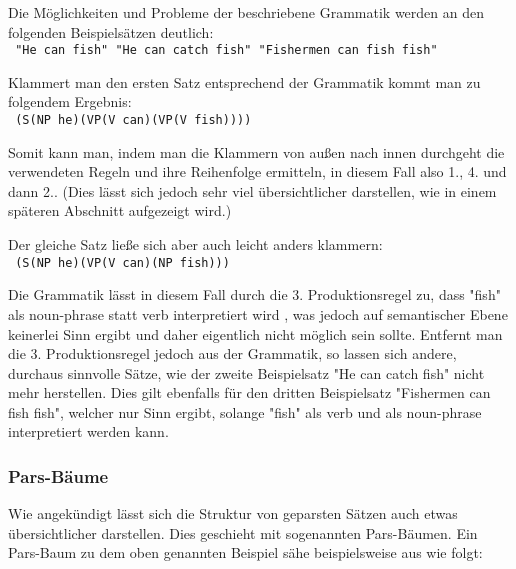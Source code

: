 \documentclass[12pt]{paper}
\begin{document}
Die Möglichkeiten und Probleme der beschriebene Grammatik werden an den folgenden Beispielsätzen deutlich:
\\

\tt
"He can fish"
"He can catch fish"
"Fishermen can fish fish"
\rm

Klammert man den ersten Satz entsprechend der Grammatik kommt man zu folgendem Ergebnis:\\

\tt 
(S(NP he)(VP(V can)(VP(V fish))))\\
\rm

Somit kann man, indem man die Klammern von außen nach innen durchgeht die verwendeten Regeln und ihre Reihenfolge ermitteln, in diesem Fall also 1., 4. und dann 2.. (Dies lässt sich jedoch sehr viel übersichtlicher darstellen, wie in einem späteren Abschnitt aufgezeigt wird.)

Der gleiche Satz ließe sich aber auch leicht anders klammern:\\

\tt
(S(NP he)(VP(V can)(NP fish)))\\
\rm

Die Grammatik lässt in diesem Fall durch die 3. Produktionsregel zu, dass "fish" als noun-phrase statt verb interpretiert wird , was jedoch auf semantischer Ebene keinerlei Sinn ergibt und daher eigentlich nicht möglich sein sollte. Entfernt man die 3. Produktionsregel jedoch aus der Grammatik, so lassen sich andere, durchaus sinnvolle Sätze, wie der zweite Beispielsatz "He can catch fish" nicht mehr herstellen. Dies gilt ebenfalls für den dritten Beispielsatz "Fishermen can fish fish", welcher nur Sinn ergibt, solange "fish" als verb und als noun-phrase interpretiert werden kann.

\subsubsection{Pars-Bäume} 

Wie angekündigt lässt sich die Struktur von geparsten Sätzen auch etwas übersichtlicher darstellen. Dies geschieht mit sogenannten Pars-Bäumen. Ein Pars-Baum zu dem oben genannten Beispiel sähe beispielsweise aus wie folgt:

\begin{center}
\end{center}
\end{document}
